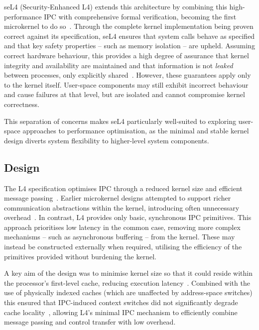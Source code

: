 seL4 (Security-Enhanced L4)\cite{klein_sel4_2009} extends this architecture by combining this high-performance IPC with comprehensive formal verification, becoming the first microkernel to do so~\cite{heiser_l4_2016}. Through the complete kernel implementation being proven correct against its specification, seL4 ensures that system calls behave as specified and that key safety properties – such as memory isolation – are upheld. Assuming correct hardware behaviour, this provides a high degree of assurance that kernel integrity and availability are maintained and that information is not \textit{leaked} between processes, only explicitly shared~\cite{klein_sel4_2009}. However, these guarantees apply only to the kernel itself. User-space components may still exhibit incorrect behaviour and cause failures at that level, but are isolated and cannot compromise kernel correctness.

This separation of concerns makes seL4 particularly well-suited to exploring user-space approaches to performance optimisation, as the minimal and stable kernel design diverts system flexibility to higher-level system components.
\newpage
\subsection{Design}\label{sec:sel4design}

The L4 specification optimises IPC through a reduced kernel size and efficient message passing~\cite{liedtke_improving_1993}. Earlier microkernel designs attempted to support richer communication abstractions within the kernel, introducing often unnecessary overhead~\cite{klimiankou_micro-clk_2021}. In contrast, L4 provides only basic, synchronous IPC primitives. This approach prioritises low latency in the common case, removing more complex mechanisms – such as asynchronous buffering – from the kernel. These may instead be constructed externally when required, utilising the efficiency of the primitives provided without burdening the kernel.

A key aim of the design was to minimise kernel size so that it could reside within the processor’s first-level cache, reducing execution latency~\cite{roch_monolithic_2004}. Combined with the use of physically indexed caches (which are unaffected by address-space switches) this ensured that IPC-induced context switches did not significantly degrade cache locality~\cite{liedtke_improving_1993}, allowing L4’s minimal IPC mechanism to efficiently combine message passing and control transfer with low overhead.

